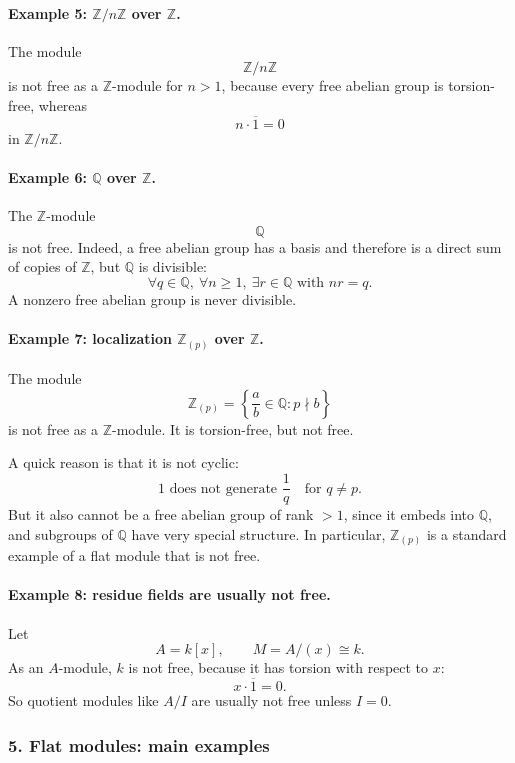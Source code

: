 \documentclass[12pt,a4paper]{article}
\theoremstyle{notespace}
\theoremstyle{definition}
\begin{document}
\paragraph{Example 5: \(\mathbb Z/n\mathbb Z\) over \(\mathbb Z\).}

The module
\[
\mathbb Z/n\mathbb Z
\]
is not free as a \(\mathbb Z\)-module for \(n>1\), because every free abelian group is torsion-free, whereas
\[
n\cdot \overline{1}=0
\]
in \(\mathbb Z/n\mathbb Z\).

\paragraph{Example 6: \(\mathbb Q\) over \(\mathbb Z\).}

The \(\mathbb Z\)-module
\[
\mathbb Q
\]
is not free. Indeed, a free abelian group has a basis and therefore is a direct sum of copies of \(\mathbb Z\), but \(\mathbb Q\) is divisible:
\[
\forall q\in \mathbb Q,\ \forall n\ge 1,\ \exists r\in \mathbb Q \text{ with } nr=q.
\]
A nonzero free abelian group is never divisible.

\paragraph{Example 7: localization \(\mathbb Z_{(p)}\) over \(\mathbb Z\).}

The module
\[
\mathbb Z_{(p)}
=
\left\{
\frac{a}{b}\in \mathbb Q : p\nmid b
\right\}
\]
is not free as a \(\mathbb Z\)-module. It is torsion-free, but not free.

A quick reason is that it is not cyclic:
\[
1 \text{ does not generate } \frac{1}{q}
\quad\text{for } q\neq p.
\]
But it also cannot be a free abelian group of rank \(>1\), since it embeds into \(\mathbb Q\), and subgroups of \(\mathbb Q\) have very special structure. In particular, \(\mathbb Z_{(p)}\) is a standard example of a flat module that is not free.

\paragraph{Example 8: residue fields are usually not free.}

Let
\[
A=k[x],
\qquad
M=A/(x)\cong k.
\]
As an \(A\)-module, \(k\) is not free, because it has torsion with respect to \(x\):
\[
x\cdot \overline{1}=0.
\]
So quotient modules like \(A/I\) are usually not free unless \(I=0\).

\subsubsection{5. Flat modules: main examples}
\end{document}
